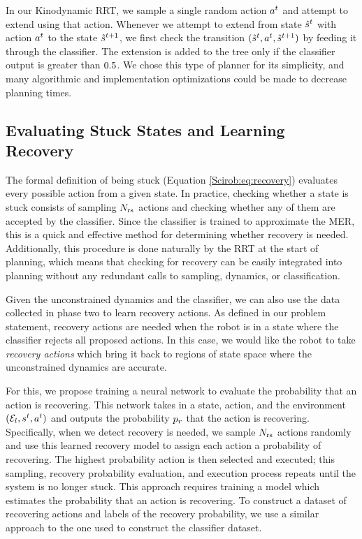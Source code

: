 In our Kinodynamic RRT, we sample a single random action $a^{t}$ and attempt to extend using that action. Whenever we attempt to extend from state $\hat{s}^{t}$ with action $a^{t}$ to the state $\hat{s}^{t+1}$, we first check the transition $(\hat{s}^{t},a^{t},\hat{s}^{t+1})$ by feeding it through the classifier. The extension is added to the tree only if the classifier output is greater than $0.5$. We chose this type of planner for its simplicity, and many algorithmic and implementation optimizations could be made to decrease planning times.

\subsection{Evaluating Stuck States and Learning Recovery}
\label{Scirob:sec:learning_recovery}

The formal definition of being stuck (Equation \eqref{Scirob:eq:recovery}) evaluates every possible action from a given state. In practice, checking whether a state is stuck consists of sampling $N_\text{rs}$ actions and checking whether any of them are accepted by the classifier. Since the classifier is trained to approximate the MER, this is a quick and effective method for determining whether recovery is needed. Additionally, this procedure is done naturally by the RRT at the start of planning, which means that checking for recovery can be easily integrated into planning without any redundant calls to sampling, dynamics, or classification.

Given the unconstrained dynamics and the classifier, we can also use the data collected in phase two to learn recovery actions. As defined in our problem statement, recovery actions are needed when the robot is in a state where the classifier rejects all proposed actions. In this case, we would like the robot to take \textit{recovery actions} which bring it back to regions of state space where the unconstrained dynamics are accurate.

For this, we propose training a neural network to evaluate the probability that an action is recovering. This network takes in a state, action, and the environment $(\mathcal{E}_l,s^{t},a^{t})$ and outputs the probability $p_r$ that the action is recovering. Specifically, when we detect recovery is needed, we sample $N_\text{rs}$ actions randomly and use this learned recovery model to assign each action a probability of recovering. The highest probability action is then selected and executed; this sampling, recovery probability evaluation, and execution process repeats until the system is no longer stuck. This approach requires training a model which estimates the probability that an action is recovering. To construct a dataset of recovering actions and labels of the recovery probability, we use a similar approach to the one used to construct the classifier dataset.

